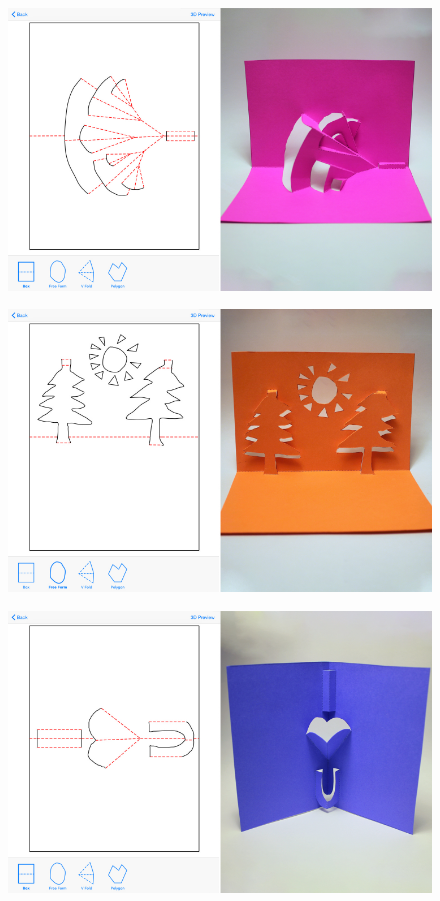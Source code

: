 \begin{figure}[htbp]
\centering
\includegraphics{figures/93_Appendix_Sample_Cards/floral_combined.pdf}
\caption{}
\end{figure}

\begin{figure}[htbp]
\centering
\includegraphics{figures/93_Appendix_Sample_Cards/forest_combined.pdf}
\caption{}
\end{figure}

\begin{figure}[htbp]
\centering
\includegraphics{figures/93_Appendix_Sample_Cards/love_combined.pdf}
\caption{}
\end{figure}

